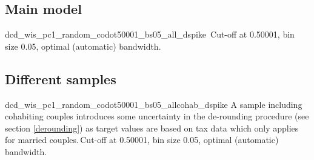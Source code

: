 \documentclass[a4paper,11pt]{scrartcl}
\begin{document}
\begin{appendix}
	\newcommand{\samplenote}{}

	\newcommand{\specnote}{Cut-off at 0.50001, bin size 0.05, optimal (automatic) bandwidth.}

	\newcommand{\dcdnoteB}{Averaged over 100 simulation runs based on procedures described in the data section. As annual income is calculated based on answers by survey respondents in the subsequent year, income related statistics for the period 2004-2016 are based on annual incomes between 2004 and 2015. Significance of differences based on two-tailed t-test; *** p$<$0.001, ** p$<$0.01, * p$<$0.05, \dag\, p$<$0.1}

	\subsection{Main model}
	\setcounter{table}{0}
	\setcounter{figure}{0}

	\renewcommand{\samplenote}{}

	{dcd_wis_pc1_random_codot50001_bs05_all_dspike}%
	{\samplenote\,\specnote}

	\subsection{Different samples}
	\setcounter{table}{0}
	\setcounter{figure}{0}


		\renewcommand{\dcdnoteA}{Note: Discontinuity estimated for the distribution of the woman's share of household income using a McCrary Test (\citeyear{mccrary2008manipulation}). Restricted to married or cohabiting couples where partners in year t$-1$ are between age 25 and 64, have positive annual income, worked at least one month, and are not in education, vocational training, civil service or parental leave, are not self-employed, and do not receive unemployment benefits or pensions.}

		\renewcommand{\samplenote}{A sample including cohabiting couples introduces some uncertainty in the de-rounding procedure (see section \ref{derounding}) as target values are based on tax data which only applies for married couples.}

		{dcd_wis_pc1_random_codot50001_bs05_allcohab_dspike}%
		{\samplenote\,\specnote}




\end{appendix}
\end{document}
